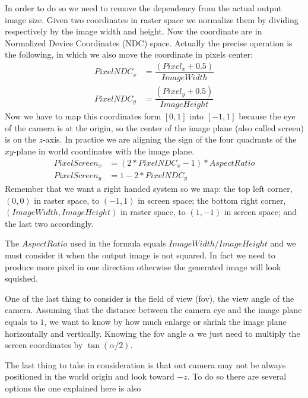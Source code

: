 In order to do so we need to remove the dependency from the actual output image size.
Given two coordinates in raster space we normalize them by dividing respectively by the image width and height.
Now the coordinate are in Normalized Device Coordinates (NDC) space.
Actually the precise operation is the following, in which we also move the coordinate in pixels center:
\begin{align*}
  PixelNDC_x &= \dfrac{(Pixel_x + 0.5)}{ImageWidth}\\
  PixelNDC_y &= \dfrac{(Pixel_y + 0.5)}{ImageHeight}
\end{align*}
Now we have to map this coordinates form $[0,1]$ into $[-1,1]$ because the eye of the camera is at the origin, so the center of the image plane (also called screen) is on the $z$-axis.
In practice we are aligning the sign of the four quadrants of the $xy$-plane in world coordinates with the image plane.
\begin{align*}
  PixelScreen_x &= (2 * PixelNDC_x - 1) * AspectRatio\\
  PixelScreen_y &= 1 - 2 * PixelNDC_y
\end{align*}
Remember that we want a right handed system so we map:
the top left corner, $(0,0)$ in raster space, to $(-1,1)$ in screen space;
the bottom right corner, $(ImageWidth,ImageHeight)$ in raster space, to $(1,-1)$ in screen space; and the last two accordingly.

The $AspectRatio$ used in the formula equals $ImageWidth / ImageHeight$ and we must consider it when the output image is not squared.
In fact we need to produce more pixel in one direction otherwise the generated image will look squished.

One of the last thing to consider is the field of view (fov), the view angle of the camera.
Assuming that the distance between the camera eye and the image plane equals to $1$, we want to know by how much enlarge or shrink the image plane horizontally and vertically.
Knowing the fov angle $\alpha$ we just need to multiply the screen coordinates by $\tan(\alpha/2)$.

The last thing to take in consideration is that out camera may not be always positioned in the world origin and look toward $-z$.
To do so there are several options the one explained here is also 





